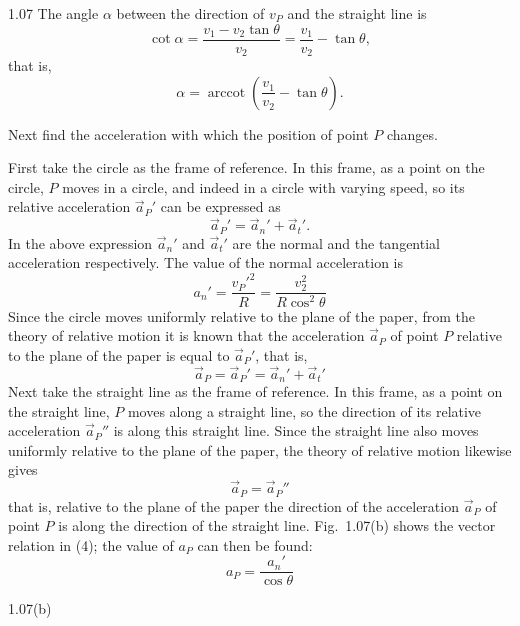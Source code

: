 \begin{solution}{1.07}
The angle $\alpha$ between the direction of $v_P$ and the straight line is
\[
\cot\alpha=\frac{v_1-v_2\tan\theta}{v_2}=\frac{v_1}{v_2}-\tan\theta,
\]
that is,
\[
\alpha=\operatorname{arccot}\left(\frac{v_1}{v_2}-\tan\theta\right).
\]

Next find the acceleration with which the position of point $P$ changes.

First take the circle as the frame of reference. In this frame, as a point on the circle, $P$ moves in a circle, and indeed in a circle with varying speed, so its relative acceleration $\vec{a}_P'$ can be expressed as
\[
\vec{a}_P'=\vec{a}_n'+\vec{a}_t'.
\]
In the above expression $\vec{a}_n'$ and $\vec{a}_t'$ are the normal and the tangential acceleration respectively. The value of the normal acceleration is
\begin{equation}
a_n'=\frac{v_P'^2}{R}=\frac{v_2^2}{R\cos^2\theta} \tag{3}
\end{equation}
Since the circle moves uniformly relative to the plane of the paper, from the theory of relative motion it is known that the acceleration $\vec{a}_P$ of point $P$ relative to the plane of the paper is equal to $\vec{a}_P'$, that is,
\begin{equation}
\vec{a}_P=\vec{a}_P'=\vec{a}_n'+\vec{a}_t' \tag{4}
\end{equation}
Next take the straight line as the frame of reference. In this frame, as a point on the straight line, $P$ moves along a straight line, so the direction of its relative acceleration $\vec{a}_P''$ is along this straight line. Since the straight line also moves uniformly relative to the plane of the paper, the theory of relative motion likewise gives
\begin{equation}
\vec{a}_P=\vec{a}_P'' \tag{5}
\end{equation}
that is, relative to the plane of the paper the direction of the acceleration $\vec{a}_P$ of point $P$ is along the direction of the straight line. Fig.~1.07(b) shows the vector relation in (4); the value of $a_P$ can then be found:
\begin{equation}
a_P=\frac{a_n'}{\cos\theta} \tag{6}
\end{equation}

\begin{figbox}{1.07(b)}
\end{figbox}


\end{solution}

